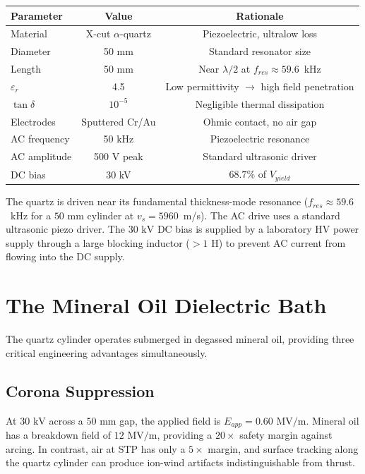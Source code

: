 \begin{center}
\begin{tabular}{|l|c|c|}
\hline
Parameter & Value & Rationale \\ \hline
Material & X-cut $\alpha$-quartz & Piezoelectric, ultralow loss \\
Diameter & 50 mm & Standard resonator size \\
Length & 50 mm & Near $\lambda/2$ at $f_{res} \approx 59.6$~kHz \\
$\varepsilon_r$ & 4.5 & Low permittivity $\to$ high field penetration \\
$\tan\delta$ & $10^{-5}$ & Negligible thermal dissipation \\
Electrodes & Sputtered Cr/Au & Ohmic contact, no air gap \\
AC frequency & 50 kHz & Piezoelectric resonance \\
AC amplitude & 500 V peak & Standard ultrasonic driver \\
DC bias & 30 kV & $68.7\%$ of $V_{yield}$ \\
\hline
\end{tabular}
\end{center}

The quartz is driven near its fundamental thickness-mode resonance ($f_{res} \approx 59.6$~kHz for a $50\text{ mm}$ cylinder at $v_s = 5960$~m/s). The AC drive uses a standard ultrasonic piezo driver. The $30\text{ kV}$ DC bias is supplied by a laboratory HV power supply through a large blocking inductor ($> 1\text{ H}$) to prevent AC current from flowing into the DC supply.

\section{The Mineral Oil Dielectric Bath}

The quartz cylinder operates submerged in degassed mineral oil, providing three critical engineering advantages simultaneously.

\subsection{Corona Suppression}

At $30\text{ kV}$ across a $50\text{ mm}$ gap, the applied field is $E_{app} = 0.60\text{ MV/m}$. Mineral oil has a breakdown field of $12\text{ MV/m}$, providing a $20\times$ safety margin against arcing. In contrast, air at STP has only a $5\times$ margin, and surface tracking along the quartz cylinder can produce ion-wind artifacts indistinguishable from thrust.


